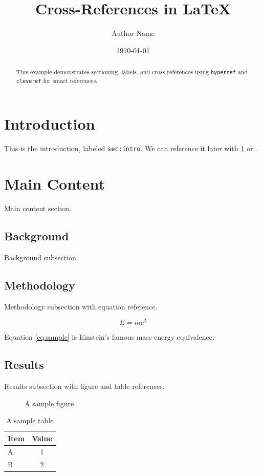 \documentclass[12pt,a4paper]{article}
\title{Cross-References in \LaTeX}
\author{Author Name}
\date{\today}
\begin{document}
\maketitle

\begin{abstract}
This example demonstrates sectioning, labels, and cross-references
using \texttt{hyperref} and \texttt{cleveref} for smart references.
\end{abstract}

\section{Introduction}\label{sec:intro}
This is the introduction, labeled \texttt{sec:intro}.
We can reference it later with \cref{sec:intro} or .

\section{Main Content}\label{sec:main}
Main content section.

\subsection{Background}\label{sec:background}
Background subsection.

\subsection{Methodology}\label{sec:methodology}
Methodology subsection with equation reference.

\begin{equation}\label{eq:sample}
E = mc^2
\end{equation}

Equation \cref{eq:sample} is Einstein's famous mass-energy equivalence.

\subsection{Results}\label{sec:results}
Results subsection with figure and table references.

\begin{figure}[htbp]
\centering
{}
\caption{A sample figure}\label{fig:sample}
\end{figure}

\begin{table}[htbp]
\centering
\begin{tabular}{lc}
\hline
Item & Value \\
\hline
A & 1 \\
B & 2 \\
\hline
\end{tabular}
\caption{A sample table}\label{tab:sample}
\end{table}
\end{document}
